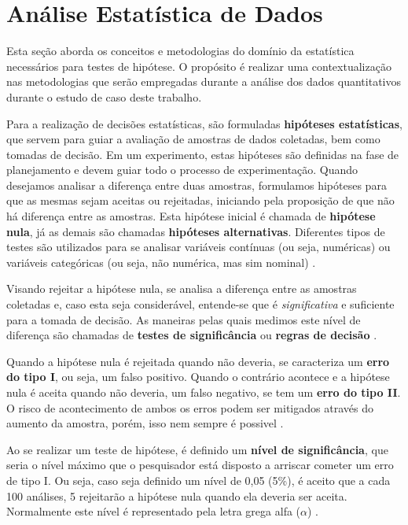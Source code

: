 \section{Análise Estatística de Dados}
\label{sec:ref-analise-dados}

Esta seção aborda os conceitos e metodologias do domínio da estatística necessários para testes de hipótese. O propósito é realizar uma contextualização nas metodologias que serão empregadas durante a análise dos dados quantitativos durante o estudo de caso deste trabalho.

Para a realização de decisões estatísticas, são formuladas \textbf{hipóteses estatísticas}, que servem para guiar a avaliação de amostras de dados coletadas, bem como tomadas de decisão. Em um experimento, estas hipóteses são definidas na fase de planejamento e devem guiar todo o processo de experimentação. Quando desejamos analisar a diferença entre duas amostras, formulamos hipóteses para que as mesmas sejam aceitas ou rejeitadas, iniciando pela proposição de que não há diferença entre as amostras. Esta hipótese inicial é chamada de \textbf{hipótese nula}, já as demais são chamadas \textbf{hipóteses alternativas}. Diferentes tipos de testes são utilizados para se analisar variáveis contínuas (ou seja, numéricas) ou variáveis categóricas (ou seja, não numérica, mas sim nominal)  \cite{juristo_basics_2001}.

Visando rejeitar a hipótese nula, se analisa a diferença entre as amostras coletadas e, caso esta seja considerável, entende-se que é \textit{significativa} e suficiente para a tomada de decisão. As maneiras pelas quais medimos este nível de diferença são chamadas de \textbf{testes de significância} ou \textbf{regras de decisão} \cite{juristo_basics_2001}.

Quando a hipótese nula é rejeitada quando não deveria, se caracteriza um \textbf{erro do tipo I}, ou seja, um falso positivo. Quando o contrário acontece e a hipótese nula é aceita quando não deveria, um falso negativo, se tem um \textbf{erro do tipo II}. O risco de acontecimento de ambos os erros podem ser mitigados através do aumento da amostra, porém, isso nem sempre é possivel \cite{wohlin_experimentation_2012}.

Ao se realizar um teste de hipótese, é definido um \textbf{nível de significância}, que seria o nível máximo que o pesquisador está disposto a arriscar cometer um erro de tipo I. Ou seja, caso seja definido um nível de 0,05 (5\%), é aceito que a cada 100 análises, 5 rejeitarão a hipótese nula quando ela deveria ser aceita. Normalmente este nível é representado pela letra grega alfa (\( \alpha \)) \cite{juristo_basics_2001}.

